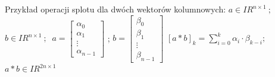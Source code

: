 \begin{frame}{Przykład operacji splotu dla dwóch wektorów kolumnowych:}
	$a \in I\!R^{n\times 1} \ ;\ $ $b \in I\!R^{n\times 1} \ ;\ $
	$a=\begin{bmatrix}
    		\alpha_0 \\
    		\alpha_1 \\
    		\vdots \\
   			 \alpha_{n-1}
		\end{bmatrix}$ ; \quad 
	$b=\begin{bmatrix}
    		\beta_0 \\
    		\beta_1 \\
    		\vdots \\
   			 \beta_{n-1}
		\end{bmatrix}$	
	$
		[ a * b ]_{k} = \sum_{i=0}^{k}\alpha_i \cdot \beta_{k-i};
	$\quad $a * b \in I\!R^{2n\times 1} $\quad
	
	\begin{table}[t]
		\centering
		\quad
	\end{table}
		\end{frame}
